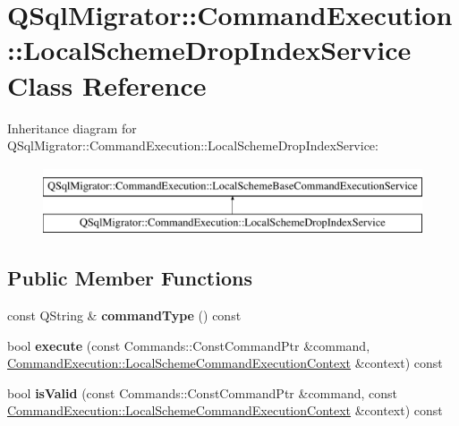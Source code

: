 \hypertarget{class_q_sql_migrator_1_1_command_execution_1_1_local_scheme_drop_index_service}{}\section{Q\+Sql\+Migrator\+:\+:Command\+Execution\+:\+:Local\+Scheme\+Drop\+Index\+Service Class Reference}
\label{class_q_sql_migrator_1_1_command_execution_1_1_local_scheme_drop_index_service}
Inheritance diagram for Q\+Sql\+Migrator\+:\+:Command\+Execution\+:\+:Local\+Scheme\+Drop\+Index\+Service\+:\begin{figure}[H]
\begin{center}
\leavevmode
\includegraphics[height=2.000000cm]{class_q_sql_migrator_1_1_command_execution_1_1_local_scheme_drop_index_service}
\end{center}
\end{figure}
\subsection*{Public Member Functions}
\begin{DoxyCompactItemize}
\item 
\mbox{\label{class_q_sql_migrator_1_1_command_execution_1_1_local_scheme_drop_index_service_a5de78254232902856ee2a7079aa651e2}} 
const Q\+String \& {\bfseries command\+Type} () const
\item 
\mbox{\label{class_q_sql_migrator_1_1_command_execution_1_1_local_scheme_drop_index_service_a7408c716d05c1851fc49f57f2cc3756d}} 
bool {\bfseries execute} (const Commands\+::\+Const\+Command\+Ptr \&command, \hyperlink{class_q_sql_migrator_1_1_command_execution_1_1_local_scheme_command_execution_context}{Command\+Execution\+::\+Local\+Scheme\+Command\+Execution\+Context} \&context) const
\item 
\mbox{\label{class_q_sql_migrator_1_1_command_execution_1_1_local_scheme_drop_index_service_a7d11db1c2aebf94684e3c1f2b6ceaa5b}} 
bool {\bfseries is\+Valid} (const Commands\+::\+Const\+Command\+Ptr \&command, const \hyperlink{class_q_sql_migrator_1_1_command_execution_1_1_local_scheme_command_execution_context}{Command\+Execution\+::\+Local\+Scheme\+Command\+Execution\+Context} \&context) const
\end{DoxyCompactItemize}


